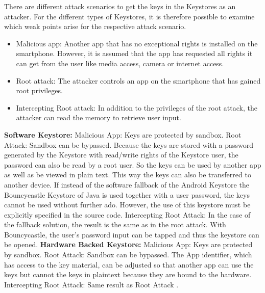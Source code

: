 \documentclass[12pt,oneside,a4paper,parskip]{scrbook}
\begin{document}
There are different attack scenarios to get the keys in the Keystores as an attacker. For the different types of Keystores, it is therefore possible to examine which weak points arise for the respective attack scenario. 
\begin{itemize}
    \item Malicious app: Another app that has no exceptional rights is installed on the smartphone. However, it is assumed that the app has requested all rights it can get from the user like media access, camera or internet access.
    \item Root attack: The attacker controls an app on the smartphone that has gained root privileges. 
    \item Intercepting Root attack: In addition to the privileges of the root attack, the attacker can read the memory to retrieve user input. 
\end{itemize}

\textbf{Software Keystore:} \newline
Malicious App: Keys are protected by sandbox. \newline
Root Attack: Sandbox can be bypassed. Because the keys are stored with a password generated by the Keystore with read/write rights of the Keystore user, the password can also be read by a root user. So the keys can be used by another app as well as be viewed in plain text. This way the keys can also be transferred to another device. \newline If instead of the software fallback of the Android Keystore the Bouncycastle Keystore of Java is used together with a user password, the keys cannot be used without further ado. However, the use of this keystore must be explicitly specified in the source code.\newline
Intercepting Root Attack: In the case of the fallback solution, the result is the same as in the root attack. With Bouncycastle, the user's password input can be tapped and thus the keystore can be opened.\newline
\textbf{Hardware Backed Keystore:} \newline
Malicious App: Keys are protected by sandbox. \newline
Root Attack: Sandbox can be bypassed. The App identifier, which has access to the key material, can be adjusted so that another app can use the keys but cannot the keys in plaintext because they are bound to the hardware.\newline
Intercepting Root Attack: Same result as Root Attack \parencite{cooijmans_analysis_2014}.
\end{document}
